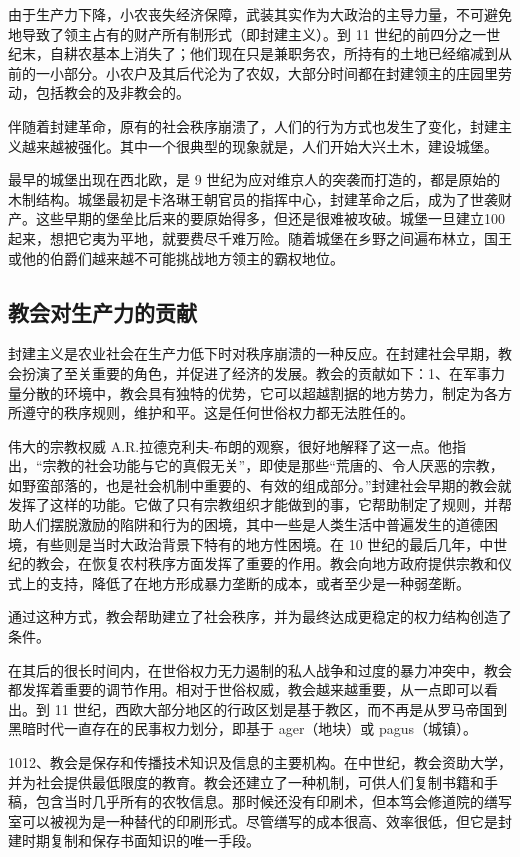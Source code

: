 由于生产力下降，小农丧失经济保障，武装其实作为大政治的主导力量，不可避免地导致了领主占有的财产所有制形式（即封建主义）。到 11 世纪的前四分之一世纪末，自耕农基本上消失了；他们现在只是兼职务农，所持有的土地已经缩减到从前的一小部分。小农户及其后代沦为了农奴，大部分时间都在封建领主的庄园里劳动，包括教会的及非教会的。

伴随着封建革命，原有的社会秩序崩溃了，人们的行为方式也发生了变化，封建主义越来越被强化。其中一个很典型的现象就是，人们开始大兴土木，建设城堡。

最早的城堡出现在西北欧，是 9 世纪为应对维京人的突袭而打造的，都是原始的木制结构。城堡最初是卡洛琳王朝官员的指挥中心，封建革命之后，成为了世袭财产。这些早期的堡垒比后来的要原始得多，但还是很难被攻破。城堡一旦建立100起来，想把它夷为平地，就要费尽千难万险。随着城堡在乡野之间遍布林立，国王或他的伯爵们越来越不可能挑战地方领主的霸权地位。

\subsection{教会对生产力的贡献}
封建主义是农业社会在生产力低下时对秩序崩溃的一种反应。在封建社会早期，教会扮演了至关重要的角色，并促进了经济的发展。教会的贡献如下：1、在军事力量分散的环境中，教会具有独特的优势，它可以超越割据的地方势力，制定为各方所遵守的秩序规则，维护和平。这是任何世俗权力都无法胜任的。

伟大的宗教权威 A.R.拉德克利夫-布朗的观察，很好地解释了这一点。他指出，“宗教的社会功能与它的真假无关”，即使是那些“荒唐的、令人厌恶的宗教，如野蛮部落的，也是社会机制中重要的、有效的组成部分。”封建社会早期的教会就发挥了这样的功能。它做了只有宗教组织才能做到的事，它帮助制定了规则，并帮助人们摆脱激励的陷阱和行为的困境，其中一些是人类生活中普遍发生的道德困境，有些则是当时大政治背景下特有的地方性困境。在 10 世纪的最后几年，中世纪的教会，在恢复农村秩序方面发挥了重要的作用。教会向地方政府提供宗教和仪式上的支持，降低了在地方形成暴力垄断的成本，或者至少是一种弱垄断。

通过这种方式，教会帮助建立了社会秩序，并为最终达成更稳定的权力结构创造了条件。

在其后的很长时间内，在世俗权力无力遏制的私人战争和过度的暴力冲突中，教会都发挥着重要的调节作用。相对于世俗权威，教会越来越重要，从一点即可以看出。到 11 世纪，西欧大部分地区的行政区划是基于教区，而不再是从罗马帝国到黑暗时代一直存在的民事权力划分，即基于 ager（地块）或 pagus（城镇）。

1012、教会是保存和传播技术知识及信息的主要机构。在中世纪，教会资助大学，并为社会提供最低限度的教育。教会还建立了一种机制，可供人们复制书籍和手稿，包含当时几乎所有的农牧信息。那时候还没有印刷术，但本笃会修道院的缮写室可以被视为是一种替代的印刷形式。尽管缮写的成本很高、效率很低，但它是封建时期复制和保存书面知识的唯一手段。

